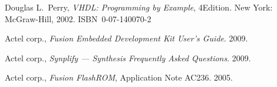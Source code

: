 \documentclass[12pt,a4paper]{article} %
\begin{document}
	
	\clearpage
	\raggedright
	\begin{thebibliography}{9}
			Douglas L.~Perry,
			\textit{VHDL: Programming by Example}, 4\nth Edition. \linebreak[2]
			New York: McGraw-Hill, 2002. ISBN~0-07-140070-2
		
			Actel corp.,
			\textit{Fusion Embedded Development Kit User's Guide}. %
			2009.
		
			Actel corp.,
			\textit{Synplify — Synthesis Frequently Asked Questions}. %
			2009.
		
			Actel corp.,
			\textit{Fusion FlashROM}, Application Note AC236. %
			2005.
		
		
	\end{thebibliography}
	
\end{document}
